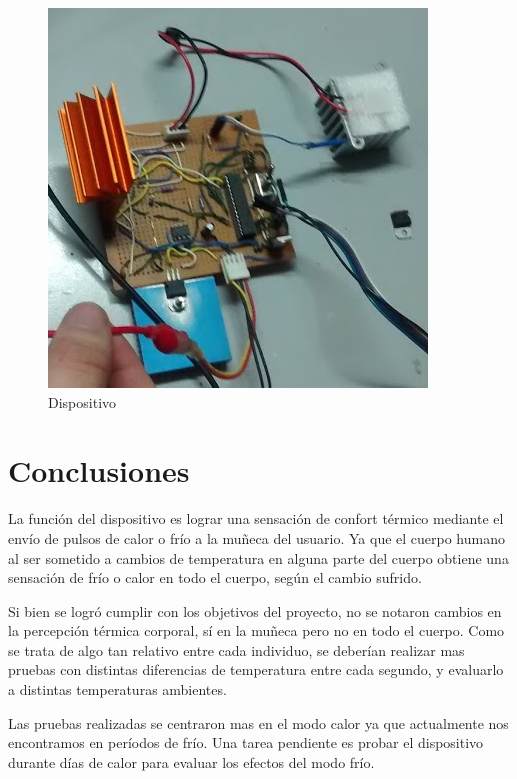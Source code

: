 \documentclass[10pt,spanish,a4paper,openany,notitlepage]{article}
\begin{document}
\begin{figure}[H] %
\begin{center}
\includegraphics[scale=0.65]{imagenes/dispositivo.png}
\caption{Dispositivo}
 \label{fig:dispositivo}
\end{center}
\end{figure}

\section{Conclusiones}

La función del dispositivo es lograr una sensación de confort térmico mediante
el envío de pulsos de calor o frío a la muñeca del usuario. Ya que
el cuerpo humano al ser sometido a cambios de temperatura en
alguna parte del cuerpo obtiene una sensación de frío o calor en todo el cuerpo, según el
cambio sufrido.

Si bien se logró cumplir con los objetivos del proyecto, no se notaron
cambios en la percepción térmica corporal, sí en la muñeca pero no en todo el cuerpo. 
Como se trata de algo tan relativo entre cada individuo, se deberían realizar 
mas pruebas con distintas diferencias de temperatura entre cada segundo, y evaluarlo
a distintas temperaturas ambientes.

Las pruebas realizadas se centraron mas en el modo calor ya que actualmente
nos encontramos en períodos de frío. Una tarea pendiente es probar el dispositivo
durante días de calor para evaluar los efectos del modo frío.
\end{document}
